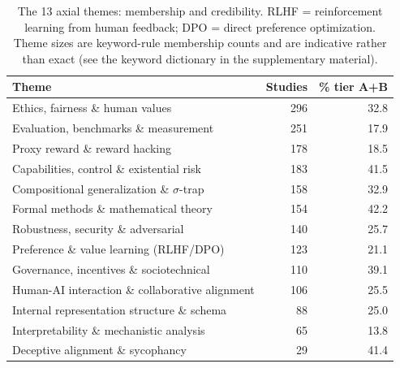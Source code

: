 \begin{table}[htbp]
\centering
\caption{The 13 axial themes: membership and credibility. RLHF = reinforcement learning from human feedback; DPO = direct preference optimization. Theme sizes are keyword-rule membership counts and are indicative rather than exact (see the keyword dictionary in the supplementary material).}
\label{tab:themes}
\begin{tabular}{lrr}
\toprule
Theme & Studies & \% tier A+B \\
\midrule
Ethics, fairness \& human values & 296 & 32.8 \\
Evaluation, benchmarks \& measurement & 251 & 17.9 \\
Proxy reward \& reward hacking & 178 & 18.5 \\
Capabilities, control \& existential risk & 183 & 41.5 \\
Compositional generalization \& $\sigma$-trap & 158 & 32.9 \\
Formal methods \& mathematical theory & 154 & 42.2 \\
Robustness, security \& adversarial & 140 & 25.7 \\
Preference \& value learning (RLHF/DPO) & 123 & 21.1 \\
Governance, incentives \& sociotechnical & 110 & 39.1 \\
Human-AI interaction \& collaborative alignment & 106 & 25.5 \\
Internal representation structure \& schema & 88 & 25.0 \\
Interpretability \& mechanistic analysis & 65 & 13.8 \\
Deceptive alignment \& sycophancy & 29 & 41.4 \\
\bottomrule
\end{tabular}
\end{table}

